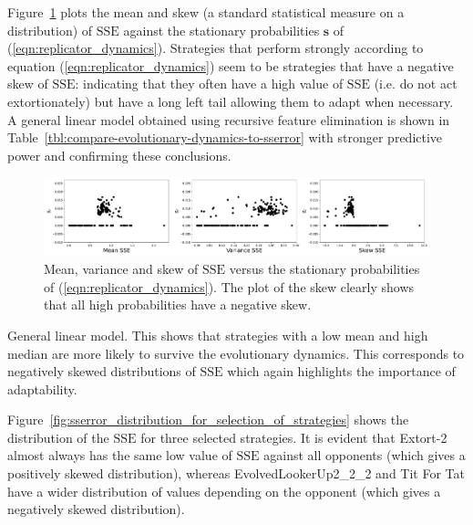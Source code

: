 \documentclass[a4paper]{article}
\newcommand{\SSe}{\text{SSE}}
\begin{document}
Figure~\ref{fig:compare-evolutionary-dynamics-to-sserror} plots the mean and
skew (a standard statistical measure on a distribution) of \(\SSe\) against the
stationary probabilities \(\textbf{s}\) of (\ref{eqn:replicator_dynamics}). Strategies
that perform strongly according to equation (\ref{eqn:replicator_dynamics}) seem
to be strategies that have a negative skew of \(\SSe\): indicating that they
often have a high value of \(\SSe\) (i.e. do not act extortionately) but have a
long left tail allowing them to adapt when necessary. A general linear model
obtained using recursive feature elimination is shown in
Table~\ref{tbl:compare-evolutionary-dynamics-to-sserror} with stronger
predictive power and confirming these conclusions.

\begin{figure}[!hbtp]
    \centering
    \includegraphics[width=\textwidth]{./assets/img/compare-evolutionary-dynamics-to-sserror/main.pdf}
    \caption{Mean, variance and skew of \(\SSe\) versus the stationary
    probabilities of (\ref{eqn:replicator_dynamics}). The plot of the skew
    clearly shows that all high probabilities have a negative skew.}
    \label{fig:compare-evolutionary-dynamics-to-sserror}
\end{figure}

\begin{table}[!hbtp]
    \begin{center}
    \tiny
    
    \end{center}
    \caption{General linear model. This shows that strategies with a low mean
    and high median are more likely to survive the evolutionary dynamics. This
    corresponds to negatively skewed distributions of \(\SSe\) which again
    highlights the importance of adaptability.}
    \label{tbl:compare-evolutionary-dynamics-to-sserror}
\end{table}

Figure~\ref{fig:sserror_distribution_for_selection_of_strategies} shows the
distribution of the \(\SSe\) for three selected strategies. It is evident that
Extort-2 almost always has the same low value of \(\SSe\) against all opponents
(which gives a positively skewed distribution), whereas EvolvedLookerUp2\_2\_2
and Tit For Tat have a wider distribution of values depending on the opponent
(which gives a negatively skewed distribution).
\end{document}
